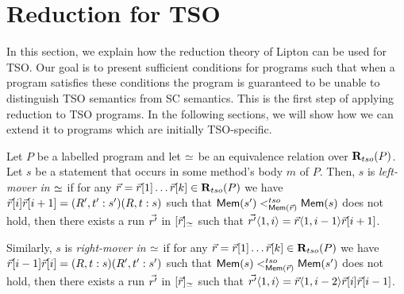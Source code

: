 \section{Reduction for TSO}
\label{sec:reduction-for-tso}
In this section, we explain how the reduction theory of Lipton can be used for TSO.
Our goal is to present sufficient conditions for programs such that when a program satisfies these conditions the program is guaranteed to be unable to distinguish TSO semantics from SC semantics. 
This is the first step of applying reduction to TSO programs.
In the following sections, we will show how we can extend it to programs which are initially TSO-specific.

\begin{definition}[Movers]
\label{def:movers}
Let $P$ be a labelled program and let $\simeq$ be an equivalence relation over $\mathbf{R}_{tso}(P)$.
Let $s$ be a statement that occurs in some method's body $m$ of $P$.
Then, $s$ is {\em left-mover in $\simeq$} if for any $\vec{r}=\vec{r}[1]\ldots\vec{r}[k]\in\mathbf{R}_{tso}(P)$ we have $\vec{r}[i]\vec{r}[i+1]=(R',t':s')(R,t:s)$ such that $\mathsf{Mem}(s') <^{tso}_{\mathsf{Mem}(\vec{r})} \mathsf{Mem}(s)$ does not hold, then there exists a run $\vec{r'}$ in $[\vec{r}]_{\simeq}$ such that $\vec{r'}\langle 1,i\rangle=\vec{r}\langle 1,i-1\rangle \vec{r}[i+1]$.

Similarly, $s$ is {\em right-mover in $\simeq$} if for any $\vec{r}=\vec{r}[1]\ldots\vec{r}[k]\in\mathbf{R}_{tso}(P)$ we have $\vec{r}[i-1]\vec{r}[i]=(R,t:s)(R',t':s')$ such that $\mathsf{Mem}(s) <^{tso}_{\mathsf{Mem}(\vec{r})} \mathsf{Mem}(s')$ does not hold, then there exists a run $\vec{r'}$ in $[\vec{r}]_{\simeq}$ such that $\vec{r'}\langle 1,i\rangle=\vec{r}\langle 1,i-2\rangle \vec{r}[i]\vec{r}[i-1]$.
\end{definition}

